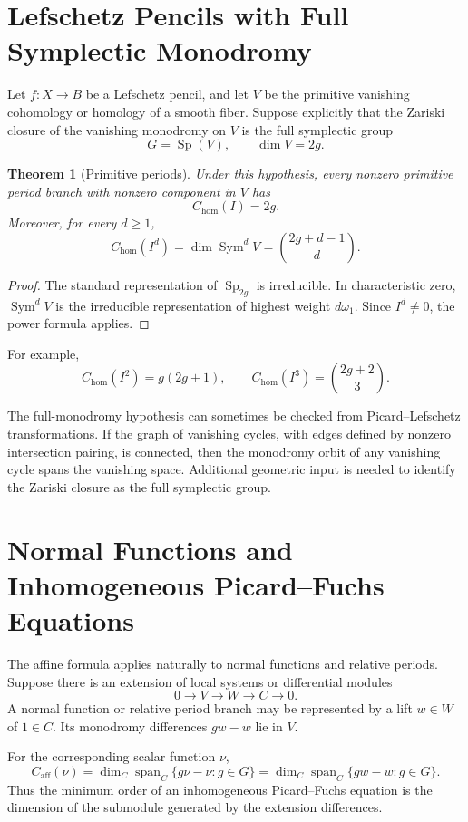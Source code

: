 \documentclass[11pt]{article}
\newtheorem{theorem}{Theorem}[section]
\DeclareMathOperator{\Span}{span}
\DeclareMathOperator{\Sym}{Sym}
\begin{document}
\section{Lefschetz Pencils with Full Symplectic Monodromy}

Let \(f:X\to B\) be a Lefschetz pencil, and let \(V\) be the primitive vanishing cohomology or homology of a smooth fiber. Suppose explicitly that the Zariski closure of the vanishing monodromy on \(V\) is the full symplectic group
\[
G=\operatorname{Sp}(V),\qquad \dim V=2g.
\]

\begin{theorem}[Primitive periods]
Under this hypothesis, every nonzero primitive period branch with nonzero component in \(V\) has
\[
C_{\mathrm{hom}}(I)=2g.
\]
Moreover, for every \(d\ge1\),
\[
C_{\mathrm{hom}}(I^d)
=
\dim\Sym^d V
=
\binom{2g+d-1}{d}.
\]
\end{theorem}

\begin{proof}
The standard representation of \(\operatorname{Sp}_{2g}\) is irreducible. In characteristic zero, \(\Sym^d V\) is the irreducible representation of highest weight \(d\omega_1\). Since \(I^d\ne0\), the power formula applies.
\end{proof}

For example,
\[
C_{\mathrm{hom}}(I^2)=g(2g+1),
\qquad
C_{\mathrm{hom}}(I^3)=\binom{2g+2}{3}.
\]

The full-monodromy hypothesis can sometimes be checked from Picard--Lefschetz transformations. If the graph of vanishing cycles, with edges defined by nonzero intersection pairing, is connected, then the monodromy orbit of any vanishing cycle spans the vanishing space. Additional geometric input is needed to identify the Zariski closure as the full symplectic group.

\section{Normal Functions and Inhomogeneous Picard--Fuchs Equations}

The affine formula applies naturally to normal functions and relative periods. Suppose there is an extension of local systems or differential modules
\[
0\to V\to W\to C\to0.
\]
A normal function or relative period branch may be represented by a lift \(w\in W\) of \(1\in C\). Its monodromy differences \(gw-w\) lie in \(V\).

For the corresponding scalar function \(\nu\),
\[
C_{\mathrm{aff}}(\nu)
=
\dim_C\Span_C\{g\nu-\nu:g\in G\}
=
\dim_C\Span_C\{gw-w:g\in G\}.
\]
Thus the minimum order of an inhomogeneous Picard--Fuchs equation is the dimension of the submodule generated by the extension differences.
\end{document}
